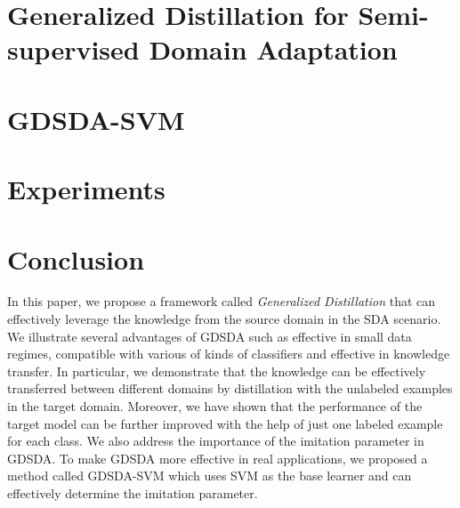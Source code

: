 \documentclass[letterpaper]{article}
\begin{document}
\section{Generalized Distillation for Semi-supervised Domain Adaptation}\label{sec:gdda}



\section{GDSDA-SVM}\label{sec:svm}


\section{Experiments}\label{sec:exp}


\section{Conclusion}\label{sec:con}
In this paper, we propose a framework called \textit{Generalized Distillation} that can effectively leverage the knowledge from the source domain in the SDA scenario. We illustrate several advantages of GDSDA such as effective in small data regimes, compatible with various of kinds of classifiers and effective in knowledge transfer. In particular, we demonstrate that the knowledge can be effectively transferred between different domains by distillation with the unlabeled examples in the target domain. Moreover, we have shown that the performance of the target model can be further improved with the help of just one labeled example for each class. We also address the importance of the imitation parameter in GDSDA. To make GDSDA more effective in real applications, we proposed a method called GDSDA-SVM which uses SVM as the base learner and can effectively determine the imitation parameter. 


\end{document}
